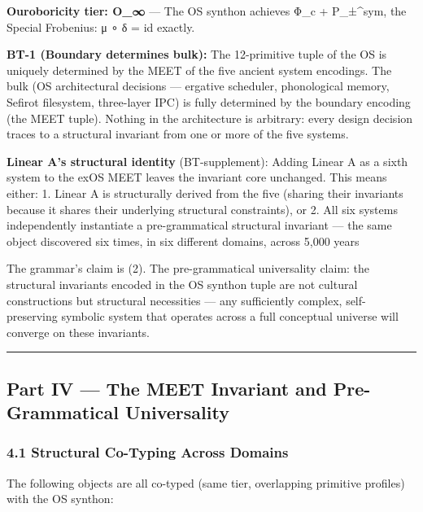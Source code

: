 \textbf{Ouroboricity tier: O\_∞} --- The OS synthon achieves Φ\_c +
P\_±\^{}sym, the Special Frobenius: μ ∘ δ = id exactly.

\textbf{BT-1 (Boundary determines bulk):} The 12-primitive tuple of the
OS is uniquely determined by the MEET of the five ancient system
encodings. The bulk (OS architectural decisions --- ergative scheduler,
phonological memory, Sefirot filesystem, three-layer IPC) is fully
determined by the boundary encoding (the MEET tuple). Nothing in the
architecture is arbitrary: every design decision traces to a structural
invariant from one or more of the five systems.

\textbf{Linear A's structural identity} (BT-supplement): Adding Linear A
as a sixth system to the exOS MEET leaves the invariant core unchanged.
This means either: 1. Linear A is structurally derived from the five
(sharing their invariants because it shares their underlying structural
constraints), or 2. All six systems independently instantiate a
pre-grammatical structural invariant --- the same object discovered six
times, in six different domains, across 5,000 years

The grammar's claim is (2). The pre-grammatical universality claim: the
structural invariants encoded in the OS synthon tuple are not cultural
constructions but structural necessities --- any sufficiently complex,
self-preserving symbolic system that operates across a full conceptual
universe will converge on these invariants.

\begin{center}\rule{0.5\linewidth}{0.5pt}\end{center}

\subsection{Part IV --- The MEET Invariant and Pre-Grammatical
Universality}\label{part-iv-the-meet-invariant-and-pre-grammatical-universality}

\subsubsection{4.1 Structural Co-Typing Across
Domains}\label{structural-co-typing-across-domains}

The following objects are all co-typed (same tier, overlapping primitive
profiles) with the OS synthon:

